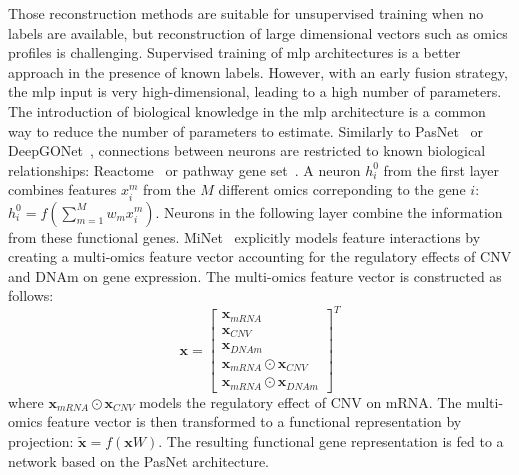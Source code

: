 \documentclass[../main.tex]{subfiles}
\begin{document}
			Those reconstruction methods are suitable for unsupervised training when no labels are available, but reconstruction of large dimensional vectors such as omics profiles is challenging.
			Supervised training of \gls{mlp} architectures is a better approach in the presence of known labels.
			However, with an early fusion strategy, the \gls{mlp} input is very high-dimensional, leading to a high number of parameters.
			The introduction of biological knowledge in the \gls{mlp} architecture is a common way to reduce the number of parameters to estimate.
			Similarly to PasNet~\cite{haoPASNetPathwayassociatedSparse2018} or DeepGONet~\cite{bourgeaisDeepGONetSelfexplainable2021}, connections between neurons are restricted to known biological relationships: Reactome~\cite{PNet} or pathway gene set~\cite{DeepOmix}.
			A neuron \(h^{0}_{i}\) from the first layer combines features \(x_{i}^{m}\) from the \(M\) different omics correponding to the gene \(i\): \(h^{0}_{i} = f\left( \sum_{m=1}^{M} w_{m}x_{i}^{m} \right) \).
			Neurons in the following layer combine the information from these functional genes.
			MiNet~\cite{Hao2019} explicitly models feature interactions by creating a multi-omics feature vector accounting for the regulatory effects of CNV and DNAm on gene expression.
			The multi-omics feature vector is constructed as follows:
			\begin{equation}
				\symbf{x} = {
				\begin{bmatrix}
					\symbf{x}_{mRNA}                      \\
					\symbf{x}_{CNV}                       \\
					\symbf{x}_{DNAm}                      \\
					\symbf{x}_{mRNA}\odot \symbf{x}_{CNV} \\
					\symbf{x}_{mRNA}\odot \symbf{x}_{DNAm}
				\end{bmatrix}
				}^T
			\end{equation}
			where \(\symbf{x}_{mRNA}\odot \symbf{x}_{CNV}\) models the regulatory effect of CNV on mRNA.
			The multi-omics feature vector is then transformed to a functional representation by projection: \(\tilde{\symbf{x}} = f\left(\symbf{x}W\right)\).
			The resulting functional gene representation is fed to a network based on the PasNet architecture.
\end{document}
